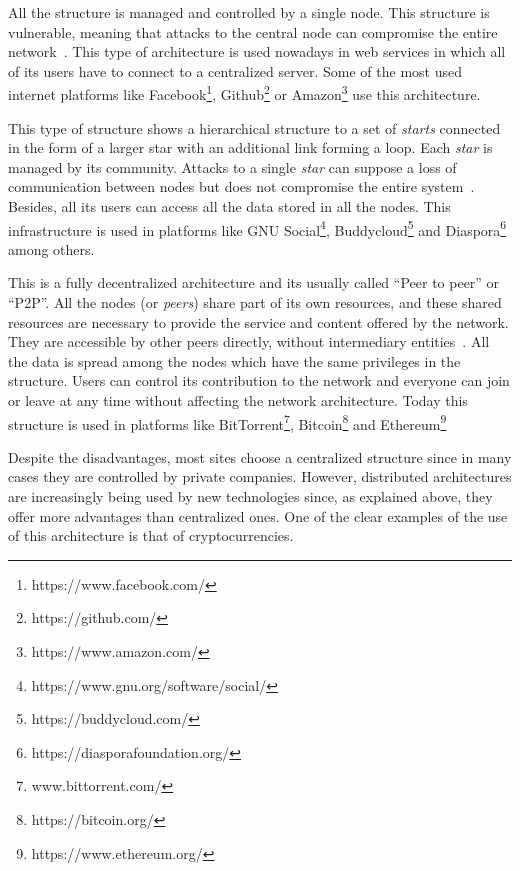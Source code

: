 \begin{itemize}
   All the structure is managed and controlled
  by a single node. This structure is vulnerable, meaning that attacks to the
  central node can compromise the entire network~\cite{baran1964distributed}.
  This type of architecture is used nowadays in web services in which all of its
  users have to connect to a centralized server. Some of the most used internet
  platforms like Facebook\footnote{https://www.facebook.com/},
  Github\footnote{https://github.com/} or
  Amazon\footnote{https://www.amazon.com/} use this architecture.
  
   This type of structure shows a hierarchical
  structure to a set of \emph{starts} connected in the form of a larger star
  with an additional link forming a loop. Each \emph{star} is managed by its
  community. Attacks to a single \emph{star} can suppose a loss of communication
  between nodes but does not compromise the entire
  system~\cite{baran1964distributed}. Besides, all its users can access all the
  data stored in all the nodes. This infrastructure is used in platforms like
  GNU Social\footnote{https://www.gnu.org/software/social/},
  Buddycloud\footnote{https://buddycloud.com/} and
  Diaspora\footnote{https://diasporafoundation.org/} among others.

   This is a fully decentralized architecture
  and its usually called ``Peer to peer'' or ``P2P''. All the nodes (or
  \emph{peers}) share part of its own resources, and these shared resources are
  necessary to provide the service and content offered by the network. They are
  accessible by other peers directly, without intermediary
  entities~\cite{schollmeier2001definition}. All the data is spread among the
  nodes which have the same privileges in the structure. Users can control its
  contribution to the network and everyone can join or leave at any time without
  affecting the network architecture. Today this structure is used in platforms
  like BitTorrent\footnote{www.bittorrent.com/},
  Bitcoin\footnote{https://bitcoin.org/} and
  Ethereum\footnote{https://www.ethereum.org/}
\end{itemize}

Despite the disadvantages, most sites choose a centralized structure since in
many cases they are controlled by private companies. However, distributed
architectures are increasingly being used by new technologies since, as
explained above, they offer more advantages than centralized ones. One of the
clear examples of the use of this architecture is that of cryptocurrencies.

